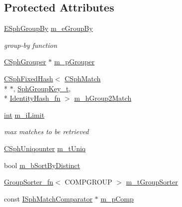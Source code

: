 \subsection*{Protected Attributes}
\begin{DoxyCompactItemize}
\item 
\hyperlink{sphinx_8h_a54472d41a76434c6d6535d438bc080bf}{E\-Sph\-Group\-By} \hyperlink{classCSphKBufferGroupSorter_a6dbd942bde1f49a261614c331e347afe}{m\-\_\-e\-Group\-By}
\begin{DoxyCompactList}\small\item\em group-\/by function \end{DoxyCompactList}\item 
\hyperlink{classCSphGrouper}{C\-Sph\-Grouper} $\ast$ \hyperlink{classCSphKBufferGroupSorter_a5fd43724c6c36da29c93d51daa28f907}{m\-\_\-p\-Grouper}
\item 
\hyperlink{classCSphFixedHash}{C\-Sph\-Fixed\-Hash}$<$ \hyperlink{classCSphMatch}{C\-Sph\-Match} \\*
$\ast$, \hyperlink{sphinxsort_8cpp_ab18dbc744a7e1518a776845191f194c8}{Sph\-Group\-Key\-\_\-t}, \\*
\hyperlink{structIdentityHash__fn}{Identity\-Hash\-\_\-fn} $>$ \hyperlink{classCSphKBufferGroupSorter_a1d4e4788ed911ba7669d06726aae212a}{m\-\_\-h\-Group2\-Match}
\item 
\hyperlink{sphinxexpr_8cpp_a4a26e8f9cb8b736e0c4cbf4d16de985e}{int} \hyperlink{classCSphKBufferGroupSorter_a05b589f8d2549af833b36c19b99167ea}{m\-\_\-i\-Limit}
\begin{DoxyCompactList}\small\item\em max matches to be retrieved \end{DoxyCompactList}\item 
\hyperlink{classCSphUniqounter}{C\-Sph\-Uniqounter} \hyperlink{classCSphKBufferGroupSorter_a576994607f66fb733836db0a8466f22d}{m\-\_\-t\-Uniq}
\item 
bool \hyperlink{classCSphKBufferGroupSorter_a27567c54ff3ffd4c83daebf4bb09470b}{m\-\_\-b\-Sort\-By\-Distinct}
\item 
\hyperlink{structGroupSorter__fn}{Group\-Sorter\-\_\-fn}$<$ C\-O\-M\-P\-G\-R\-O\-U\-P $>$ \hyperlink{classCSphKBufferGroupSorter_a792befd75f67c1556546c640c8393e52}{m\-\_\-t\-Group\-Sorter}
\item 
const \hyperlink{structISphMatchComparator}{I\-Sph\-Match\-Comparator} $\ast$ \hyperlink{classCSphKBufferGroupSorter_af20c745bde2af6c96c8166f598f1c3f7}{m\-\_\-p\-Comp}
\item 

\end{DoxyCompactItemize}
